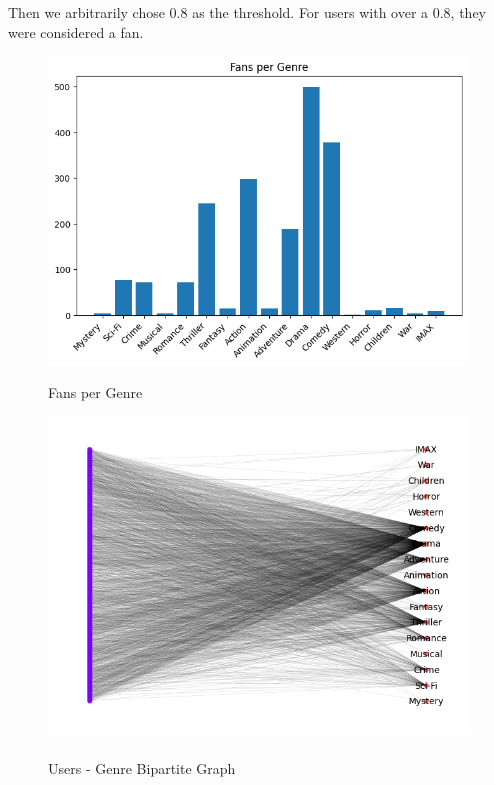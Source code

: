 \documentclass[12pt]{article}
\numberwithin{equation}{section}
\begin{document}
Then we arbitrarily chose 0.8 as the threshold. For users with over a 0.8, they were considered a fan. 

\begin{figure}[h!]
    \begin{minipage}[b]{0.49\linewidth}
         \centering
  	\includegraphics[width=0.99\textwidth]{fans_per_genre.png}
  	\label{fig:fanspergenre}
	 \caption{Fans per Genre}
    \end{minipage}
    \hspace{0.01 cm}
    \begin{minipage}[b]{0.49\linewidth}
         \centering
  	\includegraphics[width=0.99\textwidth]{genre_bipartite.png}
  	\caption{\\Users - Genre Bipartite Graph}
  	\label{fig:genre_bipartite}
    \end{minipage}
\end{figure}
\end{document}
